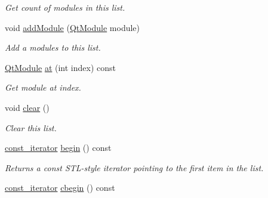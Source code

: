 \begin{DoxyCompactItemize}
\begin{DoxyCompactList}\small\item\em Get count of modules in this list. \end{DoxyCompactList}\item 
void \hyperlink{class_mdt_1_1_deploy_utils_1_1_qt_module_list_a70e3eb92aadf3192bb143b09c02b5f4e}{add\+Module} (\hyperlink{namespace_mdt_1_1_deploy_utils_af64a196dd2a56ed4930253e7fb4ed591}{Qt\+Module} module)
\begin{DoxyCompactList}\small\item\em Add a modules to this list. \end{DoxyCompactList}\item 
\hyperlink{namespace_mdt_1_1_deploy_utils_af64a196dd2a56ed4930253e7fb4ed591}{Qt\+Module} \hyperlink{class_mdt_1_1_deploy_utils_1_1_qt_module_list_a4efff06b2cc4dd3001ffdc64ef1adab7}{at} (int index) const 
\begin{DoxyCompactList}\small\item\em Get module at index. \end{DoxyCompactList}\item 
void \hyperlink{class_mdt_1_1_deploy_utils_1_1_qt_module_list_ad35b7ca2a64b82f63e878875ec8a6a72}{clear} ()\hypertarget{class_mdt_1_1_deploy_utils_1_1_qt_module_list_ad35b7ca2a64b82f63e878875ec8a6a72}{}\label{class_mdt_1_1_deploy_utils_1_1_qt_module_list_ad35b7ca2a64b82f63e878875ec8a6a72}

\begin{DoxyCompactList}\small\item\em Clear this list. \end{DoxyCompactList}\item 
\hyperlink{class_mdt_1_1_deploy_utils_1_1_qt_module_list_ad6f5d3797918d10ffcce59cf37fcd86f}{const\+\_\+iterator} \hyperlink{class_mdt_1_1_deploy_utils_1_1_qt_module_list_aace993f55fee17ebe537d43d385b525c}{begin} () const \hypertarget{class_mdt_1_1_deploy_utils_1_1_qt_module_list_aace993f55fee17ebe537d43d385b525c}{}\label{class_mdt_1_1_deploy_utils_1_1_qt_module_list_aace993f55fee17ebe537d43d385b525c}

\begin{DoxyCompactList}\small\item\em Returns a const S\+T\+L-\/style iterator pointing to the first item in the list. \end{DoxyCompactList}\item 
\hyperlink{class_mdt_1_1_deploy_utils_1_1_qt_module_list_ad6f5d3797918d10ffcce59cf37fcd86f}{const\+\_\+iterator} \hyperlink{class_mdt_1_1_deploy_utils_1_1_qt_module_list_af6d4d9209eeb796785e9e15eaacc141e}{cbegin} () const \hypertarget{class_mdt_1_1_deploy_utils_1_1_qt_module_list_af6d4d9209eeb796785e9e15eaacc141e}{}\label{class_mdt_1_1_deploy_utils_1_1_qt_module_list_af6d4d9209eeb796785e9e15eaacc141e}


\end{DoxyCompactItemize}
